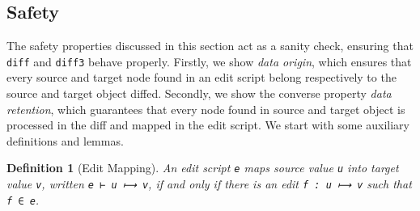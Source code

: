 \documentclass{sigplanconf}
\theoremstyle{plain}
\newtheorem{definition}{Definition}
\begin{document}
    \subsection{Safety}
    The safety properties discussed in this section act as a sanity
    check, ensuring that \texttt{diff} and \texttt{diff3} behave
    properly.
    Firstly, we show \emph{data origin}, which ensures that every source
    and target node found in an edit script belong respectively to the
    source and target object diffed.  
    Secondly, we show the converse property \emph{data retention}, which 
    guarantees that every node found in source and target object is
    processed in the diff and mapped in the edit script.
    We start with some auxiliary definitions and lemmas.




\begin{definition}[Edit Mapping]
An edit script \texttt{e} maps source value \texttt{u} into
target value \texttt{v}, written \texttt{e ⊢ u ⟼ v}, if and
only if there is an edit \texttt{f : u ⟼ v} such that \texttt{f ∈ e}.
\end{definition}

\end{document}
